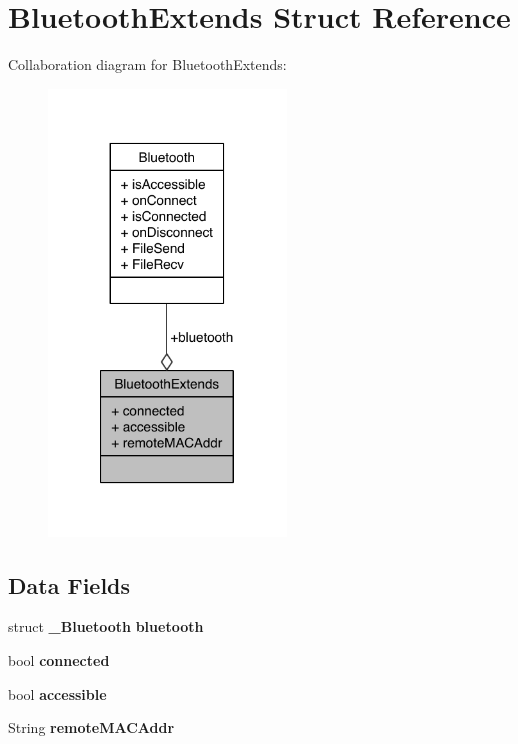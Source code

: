 \section{Bluetooth\-Extends Struct Reference}
\label{structBluetoothExtends}


Collaboration diagram for Bluetooth\-Extends\-:\nopagebreak
\begin{figure}[H]
\begin{center}
\leavevmode
\includegraphics[width=179pt]{structBluetoothExtends__coll__graph}
\end{center}
\end{figure}
\subsection*{Data Fields}
\begin{DoxyCompactItemize}
\item 
struct {\bf \-\_\-\-Bluetooth} {\bfseries bluetooth}\label{structBluetoothExtends_a2988c3ea61c07f204d31abe492d8c4bd}

\item 
bool {\bfseries connected}\label{structBluetoothExtends_ab98405f37820fcedb613ae4a9bee2708}

\item 
bool {\bfseries accessible}\label{structBluetoothExtends_aab289e7470c5f2b7c5c35176418bae58}

\item 
String {\bfseries remote\-M\-A\-C\-Addr}\label{structBluetoothExtends_a17bcb4936e21d1f61086e6287b555978}

\end{DoxyCompactItemize}


